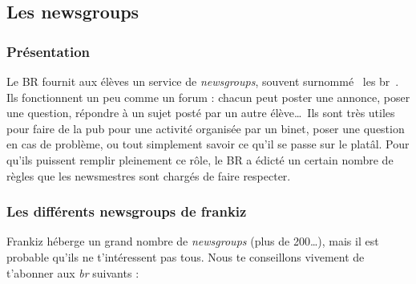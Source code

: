 \subsection{Les newsgroups}
\label{newsgroups}
\subsubsection{Présentation}
Le BR fournit aux élèves un service de \emph{newsgroups}, souvent surnommé \guillemotleft~les br~\guillemotright . Ils fonctionnent un peu comme un
forum : chacun peut poster une annonce, poser une question,
 répondre à un sujet posté par un autre élève\ldots\
Ils sont très utiles pour faire de la pub pour une activité
organisée par un binet, poser une question en cas de problème, ou
tout simplement savoir ce qu'il se passe sur le platâl. Pour qu'ils
puissent remplir pleinement ce rôle, le BR a édicté un certain
nombre de règles que les newsmestres sont chargés de faire
respecter.

\subsubsection{Les différents newsgroups de frankiz}
Frankiz héberge un grand nombre de \emph{newsgroups} (plus de 200\dots ), mais il est probable qu'ils ne t'intéressent pas tous.
Nous te conseillons vivement de t'abonner aux \emph{br} suivants :

